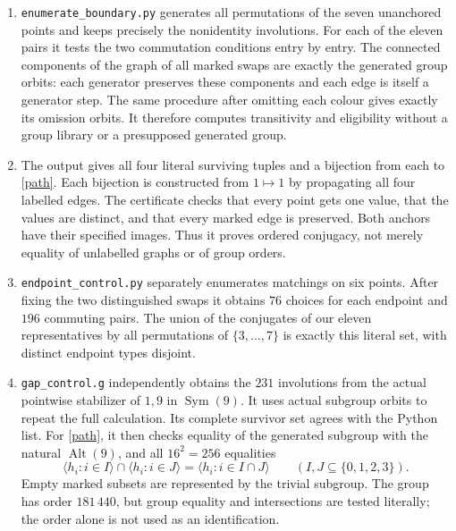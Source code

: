 \documentclass[11pt]{article}
\newcommand{\Sym}{\operatorname{Sym}}
\newcommand{\Alt}{\operatorname{Alt}}
\newcommand{\gen}[1]{\langle #1\rangle}
\begin{document}
\begin{enumerate}[label=(\roman*),leftmargin=*]
\item \texttt{enumerate\_boundary.py} generates all permutations of the seven
unanchored points and keeps precisely the nonidentity involutions. For each
of the eleven pairs it tests the two commutation conditions entry by entry.
The connected components of the graph of all marked swaps are exactly the
generated group orbits: each generator preserves these components and each
edge is itself a generator step. The same procedure after omitting each
colour gives exactly its omission orbits. It therefore computes transitivity
and eligibility without a group library or a presupposed generated group.
\item The output gives all four literal surviving tuples and a bijection
from each to \eqref{path}. Each bijection is constructed from $1\mapsto1$ by
propagating all four labelled edges. The certificate checks that every point
gets one value, that the values are distinct, and that every marked edge is
preserved. Both anchors have their specified images. Thus it proves ordered
conjugacy, not merely equality of unlabelled graphs or of group orders.
\item \texttt{endpoint\_control.py} separately enumerates matchings on six
points. After fixing the two distinguished swaps it obtains $76$ choices
for each endpoint and $196$ commuting pairs. The union of the conjugates of
our eleven representatives by all permutations of $\{3,\ldots,7\}$ is
exactly this literal set, with distinct endpoint types disjoint.
\item \texttt{gap\_control.g} independently obtains the $231$ involutions
from the actual pointwise stabilizer of $1,9$ in $\Sym(9)$. It uses actual
subgroup orbits to repeat the full calculation. Its complete survivor set
agrees with the Python list. For \eqref{path}, it then checks equality of the
generated subgroup with the natural $\Alt(9)$, and all $16^2=256$ equalities
\[
 \gen{h_i:i\in I}\cap\gen{h_i:i\in J}=\gen{h_i:i\in I\cap J}
 \qquad(I,J\subseteq\{0,1,2,3\}).
\]
Empty marked subsets are represented by the trivial subgroup. The group
has order $181\,440$, but group equality and intersections are tested
literally; the order alone is not used as an identification.
\end{enumerate}
\end{document}
